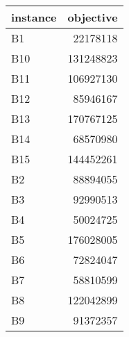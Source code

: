 \begin{tabular}{lr}
\toprule
instance &  objective \\
\midrule
      B1 &   22178118 \\
     B10 &  131248823 \\
     B11 &  106927130 \\
     B12 &   85946167 \\
     B13 &  170767125 \\
     B14 &   68570980 \\
     B15 &  144452261 \\
      B2 &   88894055 \\
      B3 &   92990513 \\
      B4 &   50024725 \\
      B5 &  176028005 \\
      B6 &   72824047 \\
      B7 &   58810599 \\
      B8 &  122042899 \\
      B9 &   91372357 \\
\bottomrule
\end{tabular}
